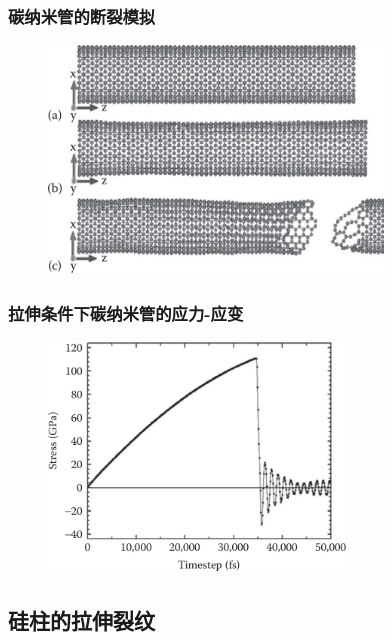 \frame
{
	\frametitle{碳纳米管的断裂模拟}
\begin{figure}[h!]
\centering
\vskip -5pt
\includegraphics[height=2.40in,width=3.5in, viewport=0 0 820 520,clip]{Figures/Lammps_tutorial-13-Fracture_of_a_CNT_under_tension.png}
\caption{\fontsize{6.2pt}{5.2pt}}%
\label{LAMMPS_Frcture-of-CNT-under_ternsion}
\end{figure}
}

\frame
{
	\frametitle{拉伸条件下碳纳米管的应力-应变}
\begin{figure}[h!]
\centering
\vskip -5pt
\includegraphics[height=2.40in,width=3.1in, viewport=0 0 820 620,clip]{Figures/Lammps_tutorial-13-Stress_strain-curve-of-a-CNT_under_tension.png}
\caption{\fontsize{6.2pt}{5.2pt}}%
\label{LAMMPS_Stress_strain-of-CNT_under_tension}
\end{figure}
}

\subsection{硅柱的拉伸裂纹}

